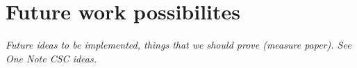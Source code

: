 \chapter{Future work possibilites}
\label{ch:future}

\emph{Future ideas to be implemented, things that we should prove (measure paper). See One Note CSC ideas.}